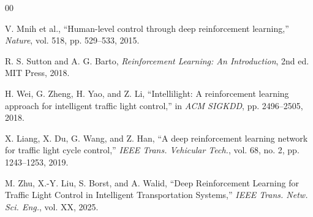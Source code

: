 \documentclass[conference]{IEEEtran}
\begin{document}

\begin{thebibliography}{00}

V. Mnih et al., ``Human-level control through deep reinforcement learning,'' \textit{Nature}, vol. 518, pp. 529--533, 2015.

R. S. Sutton and A. G. Barto, \textit{Reinforcement Learning: An Introduction}, 2nd ed. MIT Press, 2018.

H. Wei, G. Zheng, H. Yao, and Z. Li, ``Intellilight: A reinforcement learning approach for intelligent traffic light control,'' in \textit{ACM SIGKDD}, pp. 2496--2505, 2018.

X. Liang, X. Du, G. Wang, and Z. Han, ``A deep reinforcement learning network for traffic light cycle control,'' \textit{IEEE Trans. Vehicular Tech.}, vol. 68, no. 2, pp. 1243--1253, 2019.

M. Zhu, X.-Y. Liu, S. Borst, and A. Walid, ``Deep Reinforcement Learning for Traffic Light Control in Intelligent Transportation Systems,'' \textit{IEEE Trans. Netw. Sci. Eng.}, vol. XX, 2025.

\end{thebibliography}
\end{document}
